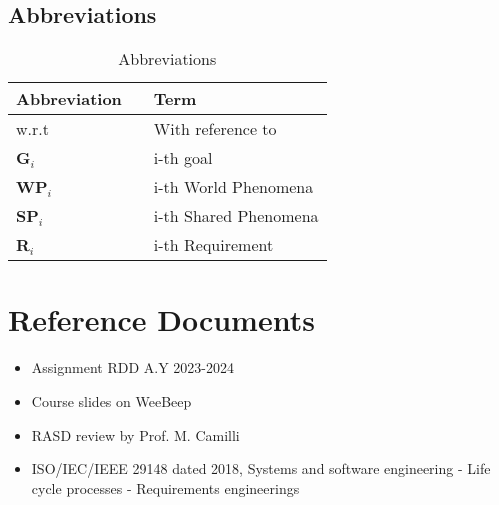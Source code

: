 \subsection{Abbreviations}
\begin{table}[H]
    \centering
    \renewcommand{\arraystretch}{1.5}
    \begin{tabular}{l l p{10.5cm}}
        \hline
        \textbf{Abbreviation} &  & \textbf{Term}         \\
        \hline
        w.r.t                 &  & With reference to     \\
        \textbf{G}\(_i\)      &  & i-th goal             \\
        \textbf{WP}\(_i\)     &  & i-th World Phenomena  \\
        \textbf{SP}\(_i\)     &  & i-th Shared Phenomena \\
        \textbf{R}\(_i\)      &  & i-th Requirement      \\
        \hline
    \end{tabular}
    \caption{Abbreviations}
\end{table}

\section{Reference Documents}
\begin{itemize}
    \item Assignment RDD A.Y 2023-2024
    \item Course slides on WeeBeep
    \item RASD review by Prof. M. Camilli
    \item ISO/IEC/IEEE 29148 dated 2018, Systems and software engineering - Life cycle processes - Requirements engineerings
\end{itemize}


